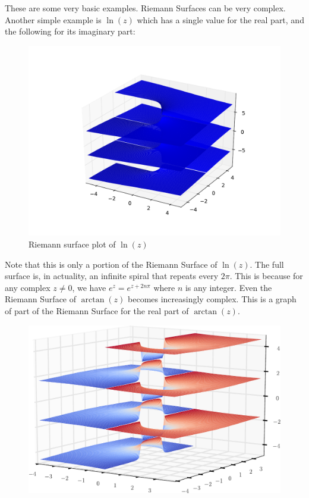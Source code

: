 These are some very basic examples. Riemann Surfaces can be very complex. Another simple example is $\ln(z)$ which has a single value for the real part, and the following for its imaginary part:
\begin{figure}[h]
\includegraphics[width=\textwidth]{RiemannSurface3}
\caption{Riemann surface plot of $\ln(z)$}
\end{figure}
Note that this is only a portion of the Riemann Surface of $\ln(z)$. The full surface is, in actuality, an infinite spiral that repeats every $2\pi$. This is because for any complex $z\neq 0$, we have $e^z=e^{z+2n\pi}$ where $n$ is any integer.
Even the Riemann Surface of $\arctan(z)$ becomes increasingly complex. This is a graph of part of the Riemann Surface for the real part of $\arctan(z)$.
\begin{figure}[h]
\includegraphics[width=\textwidth]{RiemannSurface4}
\end{figure}

